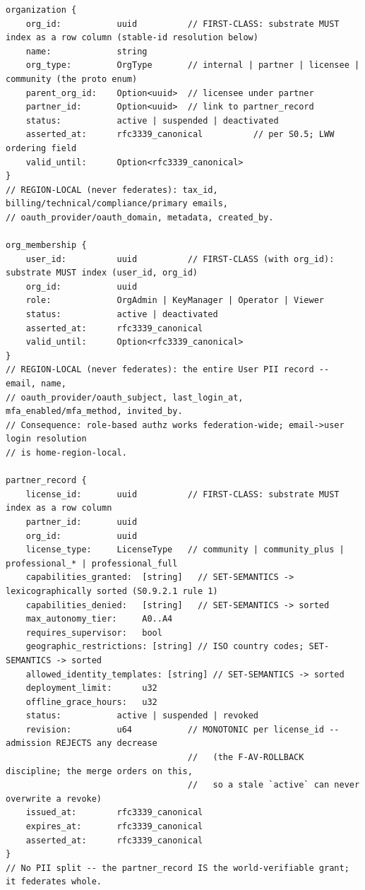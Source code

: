 \documentclass[10pt]{article}
\begin{document}
\begin{lstlisting}
organization {
    org_id:           uuid          // FIRST-CLASS: substrate MUST index as a row column (stable-id resolution below)
    name:             string
    org_type:         OrgType       // internal | partner | licensee | community (the proto enum)
    parent_org_id:    Option<uuid>  // licensee under partner
    partner_id:       Option<uuid>  // link to partner_record
    status:           active | suspended | deactivated
    asserted_at:      rfc3339_canonical          // per S0.5; LWW ordering field
    valid_until:      Option<rfc3339_canonical>
}
// REGION-LOCAL (never federates): tax_id, billing/technical/compliance/primary emails,
// oauth_provider/oauth_domain, metadata, created_by.

org_membership {
    user_id:          uuid          // FIRST-CLASS (with org_id): substrate MUST index (user_id, org_id)
    org_id:           uuid
    role:             OrgAdmin | KeyManager | Operator | Viewer
    status:           active | deactivated
    asserted_at:      rfc3339_canonical
    valid_until:      Option<rfc3339_canonical>
}
// REGION-LOCAL (never federates): the entire User PII record -- email, name,
// oauth_provider/oauth_subject, last_login_at, mfa_enabled/mfa_method, invited_by.
// Consequence: role-based authz works federation-wide; email->user login resolution
// is home-region-local.

partner_record {
    license_id:       uuid          // FIRST-CLASS: substrate MUST index as a row column
    partner_id:       uuid
    org_id:           uuid
    license_type:     LicenseType   // community | community_plus | professional_* | professional_full
    capabilities_granted:  [string]   // SET-SEMANTICS -> lexicographically sorted (S0.9.2.1 rule 1)
    capabilities_denied:   [string]   // SET-SEMANTICS -> sorted
    max_autonomy_tier:     A0..A4
    requires_supervisor:   bool
    geographic_restrictions: [string] // ISO country codes; SET-SEMANTICS -> sorted
    allowed_identity_templates: [string] // SET-SEMANTICS -> sorted
    deployment_limit:      u32
    offline_grace_hours:   u32
    status:           active | suspended | revoked
    revision:         u64           // MONOTONIC per license_id -- admission REJECTS any decrease
                                    //   (the F-AV-ROLLBACK discipline; the merge orders on this,
                                    //   so a stale `active` can never overwrite a revoke)
    issued_at:        rfc3339_canonical
    expires_at:       rfc3339_canonical
    asserted_at:      rfc3339_canonical
}
// No PII split -- the partner_record IS the world-verifiable grant; it federates whole.
\end{lstlisting}
\end{document}
